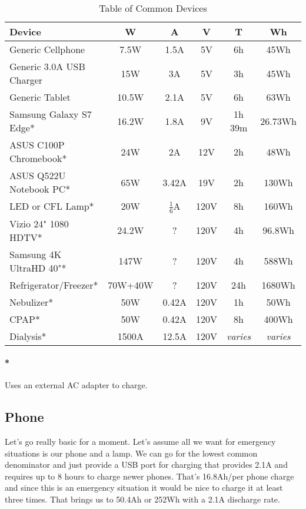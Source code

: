 \documentclass[
10pt, %
letterpaper, %
oneside, %
headinclude,footinclude, %
BCOR5mm, %
]{scrartcl}
\begin{document}
\begin{table}[hbt]
\caption{Table of Common Devices}
\centering
\begin{tabular}{lccccc}

\toprule
\textbf{Device} & \textbf{W} & \textbf{A} & \textbf{V} & \textbf{T} & \textbf{Wh} \\

\midrule
Generic Cellphone & 7.5W & 1.5A & 5V & 6h & 45Wh \\
Generic 3.0A USB Charger & 15W & 3A & 5V & 3h & 45Wh \\
Generic Tablet & 10.5W & 2.1A & 5V & 6h & 63Wh \\
Samsung Galaxy S7 Edge* & 16.2W & 1.8A & 9V & 1h 39m & 26.73Wh \\
ASUS C100P Chromebook* & 24W & 2A & 12V & 2h & 48Wh \\
ASUS Q522U Notebook PC* & 65W & 3.42A & 19V & 2h & 130Wh \\
LED or CFL Lamp* & 20W & $\frac{1}{6}$A & 120V & 8h & 160Wh \\
Vizio 24" 1080 HDTV* & 24.2W & ? & 120V & 4h & 96.8Wh \\
Samsung 4K UltraHD 40"* & 147W & ? & 120V & 4h & 588Wh \\
Refrigerator/Freezer* & 70W+40W & ? & 120V & 24h & 1680Wh \\
\midrule
Nebulizer* & 50W & 0.42A & 120V & 1h & 50Wh \\
CPAP* & 50W & 0.42A & 120V & 8h & 400Wh \\
Dialysis* & 1500A & 12.5A & 120V & \textit{varies} & \textit{varies} \\

\bottomrule
\end{tabular}
\label{tab:devices}
\end{table}
\paragraph{*}Uses an external AC adapter to charge.

\subsection{Phone}

Let's go really basic for a moment. Let's assume all we want for emergency situations is our phone and a lamp. We can go for the lowest common denominator and just provide a USB port for charging that provides 2.1A and requires up to 8 hours to charge newer phones. That's 16.8Ah/per phone charge and since this is an emergency situation it would be nice to charge it at least three times. That brings us to 50.4Ah or 252Wh with a 2.1A discharge rate.
\end{document}
